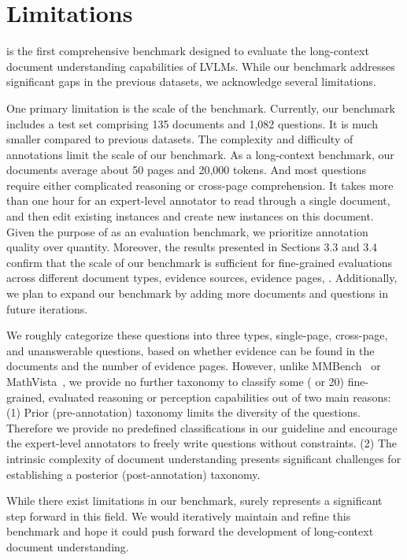 \clearpage
\section{Limitations}
\label{appendix: limitations}

\benchmarkname is the first comprehensive benchmark designed to evaluate the long-context document understanding capabilities of LVLMs. While our benchmark addresses significant gaps in the previous datasets, we acknowledge several limitations.

One primary limitation is the scale of the benchmark. Currently, our benchmark includes a test set comprising 135 documents and 1,082 questions. It is much smaller compared to previous datasets. The complexity and difficulty of annotations limit the scale of our benchmark. As a long-context benchmark, our documents average about 50 pages and 20,000 tokens. And most questions require either complicated reasoning or cross-page comprehension. It takes more than one hour for an expert-level annotator to read through a single document, and then edit existing instances and create new instances on this document. Given the purpose of \benchmarkname as an evaluation benchmark, we prioritize annotation quality over quantity. Moreover, the results presented in Sections 3.3 and 3.4 confirm that the scale of our benchmark is sufficient for fine-grained evaluations across different document types, evidence sources, evidence pages, \etc. Additionally, we plan to expand our benchmark by adding more documents and questions in future iterations.

We roughly categorize these questions into three types, \ie single-page, cross-page, and unanswerable questions, based on whether evidence can be found in the documents and the number of evidence pages. However, unlike MMBench~\cite{mmbench2023} or MathVista~\cite{lu2024mathvista}, we provide no further taxonomy to classify some ( or 20) fine-grained, evaluated reasoning or perception capabilities out of two main reasons: (1) Prior (\ie pre-annotation) taxonomy limits the diversity of the questions. Therefore we provide no predefined classifications in our guideline and encourage the expert-level annotators to freely write questions without constraints. (2) The intrinsic complexity of document understanding presents significant challenges for establishing a posterior (\ie post-annotation) taxonomy.

While there exist limitations in our benchmark, \benchmarkname surely represents a significant step forward in this field. We would iteratively maintain and refine this benchmark and hope it could push forward the development of long-context document understanding.